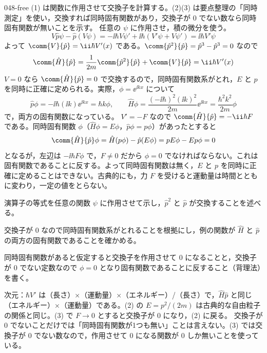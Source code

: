 \documentclass[uplatex,dvipdfmx,a4paper,11pt]{jsarticle}
\begin{document}
\begin{kaisetsu}{048-free}
\houshin (1) は関数に作用させて交換子を計算する。(2)(3) は要点整理の「同時測定」を使い，交換すれば同時固有関数があり，交換子が $0$ でない数なら同時固有関数が無いことを示す。
\keisan {} 任意の $\psi$ に作用させ，積の微分を使う。
\[ V\hat{p}\psi-\hat{p}(V\psi)=-\ii\hbar V\psi'+\ii\hbar\left(V'\psi+V\psi'\right)=\ii\hbar V'\psi \]
よって $\comm{V}{\hat{p}}=\ii\hbar V'(x)$ である。$\comm{\hat{p}^{2}}{\hat{p}}=\hat{p}^{3}-\hat{p}^{3}=0$ なので
\[ \comm{\hat{H}}{\hat{p}}=\frac{1}{2m}\comm{\hat{p}^{2}}{\hat{p}}+\comm{V}{\hat{p}}=\ii\hbar V'(x) \]
 $V=0$ なら $\comm{\hat{H}}{\hat{p}}=0$ で交換するので，同時固有関数系がとれ，$E$ と $p$ を同時に正確に定められる。実際，$\phi=\ee^{\ii kx}$ について
\[ \hat{p}\phi=-\ii\hbar(\ii k)\ee^{\ii kx}=\hbar k\phi,\qquad \hat{H}\phi=\frac{(-\ii\hbar)^{2}(\ii k)^{2}}{2m}\ee^{\ii kx}=\frac{\hbar^{2}k^{2}}{2m}\phi \]
で，両方の固有関数になっている。
 $V'=-F$ なので $\comm{\hat{H}}{\hat{p}}=-\ii\hbar F$ である。同時固有関数 $\phi$（$\hat{H}\phi=E\phi$，$\hat{p}\phi=p\phi$）があったとすると
\[ \comm{\hat{H}}{\hat{p}}\phi=\hat{H}(p\phi)-\hat{p}(E\phi)=pE\phi-Ep\phi=0 \]
となるが，左辺は $-\ii\hbar F\phi$ で，$F\ne 0$ だから $\phi=0$ でなければならない。これは固有関数であることに反する。よって同時固有関数は無く，$E$ と $p$ を同時に正確に定めることはできない。古典的にも，力 $F$ を受けると運動量は時間とともに変わり，一定の値をとらない。
\begin{ronten}
  \item {} 演算子の等式を任意の関数 $\psi$ に作用させて示し，$\hat{p}^{2}$ と $\hat{p}$ が交換することを述べる。
  \item {} 交換子が $0$ なので同時固有関数系がとれることを根拠にし，例の関数が $\hat{H}$ と $\hat{p}$ の両方の固有関数であることを確かめる。
  \item {} 同時固有関数があると仮定すると交換子を作用させて $0$ になることと，交換子が $0$ でない定数なので $\phi=0$ となり固有関数であることに反すること（背理法）を書く。
\end{ronten}
\kenzan 次元：$\hbar V'$ は（長さ）×（運動量）×（エネルギー）/（長さ）で，$\hat{H}\hat{p}$ と同じ（エネルギー）×（運動量）である。(2) の $E=p^{2}/(2m)$ は古典的な自由粒子の関係と同じ。(3) で $F\to 0$ とすると交換子が $0$ になり，(2) に戻る。
\tsumazuki 交換子が $0$ でないことだけでは「同時固有関数が1つも無い」ことは言えない。(3) では交換子が $0$ でない数なので，作用させて $0$ になる関数が $0$ しか無いことを使っている。
\end{kaisetsu}
\end{document}
